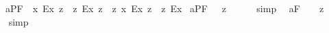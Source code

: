 \begin{isabellebody}
\ \ a{}{}{\isacharunderscore}{}{\isacharunderscore}PF{\isacharcolon}\ {\isachardoublequoteopen}{\isacharbrackleft}{\isasymdiamond}\ {\isacharparenleft}{\isasymexists}{\isacharparenleft}{\isasymlambda}x{\isachardot}\ {\isacharless}{\isachardot}E{\isachardot}{\isasymbullet}{\isachardot}x{\isachardot}{\isachargreater}\ {\isasymand}\isactrlsup z\ {\isacharparenleft}{\isasymdiamond}\ {\isacharparenleft}{\isasymnot}\isactrlsup z\ {\isacharless}{\isachardot}E{\isachardot}{\isasymbullet}{\isachardot}x{\isachardot}{\isachargreater}{\isacharparenright}{\isacharparenright}{\isacharparenright}{\isacharparenright}\ {\isasymand}\isactrlsup z\ {\isasymdiamond}\ {\isacharparenleft}{\isasymnot}\isactrlsup z\ {\isacharparenleft}{\isasymexists}{\isacharparenleft}{\isasymlambda}x{\isachardot}\ {\isacharless}{\isachardot}E{\isachardot}{\isasymbullet}{\isachardot}x{\isachardot}{\isachargreater}\ {\isasymand}\isactrlsup z\ {\isacharparenleft}{\isasymdiamond}\ {\isacharparenleft}{\isasymnot}\isactrlsup z\ {\isacharless}{\isachardot}E{\isachardot}{\isasymbullet}{\isachardot}x{\isachardot}{\isachargreater}{\isacharparenright}{\isacharparenright}{\isacharparenright}{\isacharparenright}{\isacharparenright}{\isacharbrackright}{\isachardoublequoteclose}%
\isamarkuptrue%
\isamarkupfalse%
\ a{}{}{\isacharunderscore}{}{\isacharunderscore}PF{\isacharcolon}\ {\isachardoublequoteopen}{\isacharbrackleft}{\isasymA}\ {\isacharcomma}{\isasymphi}{\isacharcomma}\ {\isasymrightarrow}\isactrlsup z\ {\isasymbox}\ {\isacharparenleft}{\isasymA}\ {\isacharcomma}{\isasymphi}{\isacharcomma}{\isacharparenright}{\isacharbrackright}{\isachardoublequoteclose}%
\isadelimproof
\ %
\endisadelimproof
%
\isatagproof
{}\isamarkupfalse%
\ simp\ \isamarkupfalse%
%
\endisatagproof
{\isafoldproof}%
%
\isadelimproof
%
\endisadelimproof
\isanewline
{}\isamarkupfalse%
\ a{}{}{\isacharunderscore}{}{\isacharunderscore}F{\isacharcolon}\ \ {\isachardoublequoteopen}{\isacharbrackleft}{\isasymA}\ {\isacharsemicolon}{\isasymphi}{\isacharsemicolon}\ {\isasymrightarrow}\isactrlsup z\ {\isasymbox}\ {\isacharparenleft}{\isasymA}\ {\isacharsemicolon}{\isasymphi}{\isacharsemicolon}{\isacharparenright}{\isacharbrackright}{\isachardoublequoteclose}%
\isadelimproof
\ %
\endisadelimproof
%
\isatagproof
{}\isamarkupfalse%
\ simp\ \isamarkupfalse%
%
\endisatagproof
{\isafoldproof}%

\end{isabellebody}
